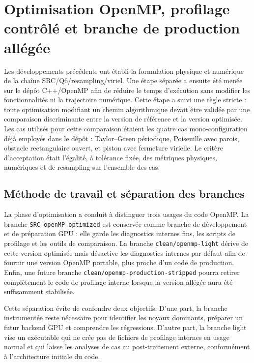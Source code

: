 \documentclass[11pt,a4paper]{article}
\begin{document}
\section{Optimisation OpenMP, profilage contrôlé et branche de production allégée}

Les développements précédents ont établi la formulation physique et numérique de la chaîne SRC/Q6/resampling/viriel. Une étape séparée a ensuite été menée sur le dépôt C++/OpenMP afin de réduire le temps d'exécution sans modifier les fonctionnalités ni la trajectoire numérique. Cette étape a suivi une règle stricte : toute optimisation modifiant un chemin algorithmique devait être validée par une comparaison discriminante entre la version de référence et la version optimisée. Les cas utilisés pour cette comparaison étaient les quatre cas mono-configuration déjà employés dans le dépôt : Taylor--Green périodique, Poiseuille avec parois, obstacle rectangulaire ouvert, et piston avec fermeture virielle. Le critère d'acceptation était l'égalité, à tolérance fixée, des métriques physiques, numériques et de resampling sur l'ensemble des cas.

\subsection{Méthode de travail et séparation des branches}

La phase d'optimisation a conduit à distinguer trois usages du code OpenMP. La branche \texttt{SRC\_openMP\_optimized} est conservée comme branche de développement et de préparation GPU : elle garde les diagnostics internes fins, les scripts de profilage et les outils de comparaison. La branche \texttt{clean/openmp-light} dérive de cette version optimisée mais désactive les diagnostics internes par défaut afin de fournir une version OpenMP portable, plus proche d'un code de production. Enfin, une future branche \texttt{clean/openmp-production-stripped} pourra retirer complètement le code de profilage interne lorsque la version allégée aura été suffisamment stabilisée.

Cette séparation évite de confondre deux objectifs. D'une part, la branche instrumentée reste nécessaire pour identifier les noyaux dominants, préparer un futur backend GPU et comprendre les régressions. D'autre part, la branche light vise un exécutable qui ne crée pas de fichiers de profilage internes en usage normal et qui laisse les analyses de cas au post-traitement externe, conformément à l'architecture initiale du code.
\end{document}
